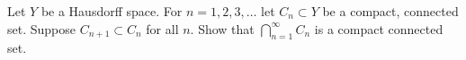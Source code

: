 Let $Y$ be a Hausdorff space. For $n=1,2,3,\ldots $ let $C_n\subset Y$
be a compact, connected set. Suppose $C_{n+1}\subset C_n$ for all
$n$. Show that $\bigcap_{n=1}^{\infty}C_n$ is a compact connected set.
